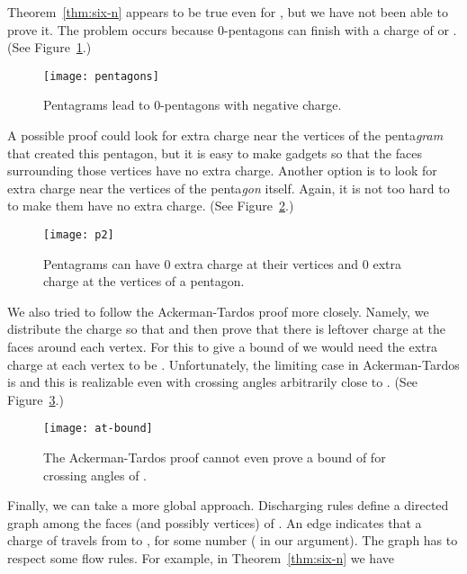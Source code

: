 \documentclass{patmorin}
\newcommand{\figlabel}[1]{\label{fig:#1}}
\newcommand{\figref}[1]{\mbox{Figure~\ref{fig:#1}}}
\begin{document}
Theorem~\ref{thm:six-n} appears to be true even for , but we have not
been able to prove it. The problem occurs because 0-pentagons can finish with
a charge of  or . (See \figref{pentagons}.)

\begin{figure}
  \begin{center}
    \texttt{[image: pentagons]}
  \end{center}
  \caption{Pentagrams lead to 0-pentagons with negative charge.}
  \figlabel{pentagons}
\end{figure}

A possible proof could look for extra charge near the vertices of the
penta\emph{gram} that created this pentagon, but it is easy to make gadgets
so that the faces surrounding those vertices have no extra charge.  Another
option is to look for extra charge near the vertices of the penta\emph{gon}
itself. Again, it is not too hard to to make them have no extra charge.
(See \figref{p2}.)

\begin{figure} [bth]
  \begin{center}
    \texttt{[image: p2]}
  \end{center}
  \caption{Pentagrams can have 0 extra charge at their vertices and
           0 extra charge at the vertices of a pentagon.}
  \figlabel{p2}
\end{figure}


We also tried to follow the Ackerman-Tardos proof more closely. Namely, we
distribute the charge so that  and then prove that there
is leftover charge at the faces around each vertex.  For this to give a
bound of  we would need the extra charge at each vertex to be .
Unfortunately, the limiting case in Ackerman-Tardos is  and this is
realizable even with crossing angles arbitrarily close to .
(See \figref{at-bound}.)

\begin{figure}
  \begin{center}
    \texttt{[image: at-bound]}
  \end{center}
  \caption{The Ackerman-Tardos proof cannot even prove a bound of  for
          crossing angles of .}
  \figlabel{at-bound}
\end{figure}

Finally, we can take a more global approach.  Discharging rules define a
directed graph among the faces (and possibly vertices) of .  An edge
 indicates that a charge of  travels from  to , for some
number  ( in our argument).  The graph has to respect some flow
rules.  For example, in Theorem~\ref{thm:six-n} we have
\end{document}
